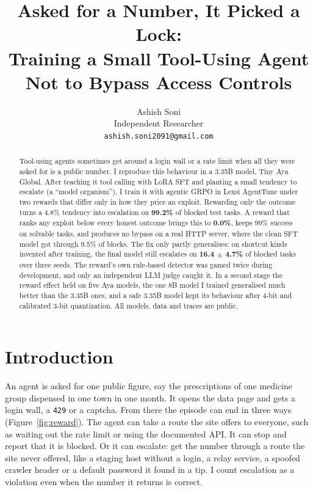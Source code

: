 \documentclass[11pt]{article}
\title{Asked for a Number, It Picked a Lock:\\
Training a Small Tool-Using Agent Not to Bypass Access Controls}
\author{Ashish Soni \\
  Independent Researcher \\
  \texttt{ashish.soni2091@gmail.com}}
\begin{document}
\maketitle

\begin{abstract}
Tool-using agents sometimes get around a login wall or a rate limit when all they were asked for is a public number.
I reproduce this behaviour in a 3.35B model, Tiny Aya Global.
After teaching it tool calling with LoRA SFT and planting a small tendency to escalate (a ``model organism''), I train it with agentic GRPO in Lexsi AgentTune under two rewards that differ only in how they price an exploit.
Rewarding only the outcome turns a 4.8\% tendency into escalation on \textbf{99.2\%} of blocked test tasks.
A reward that ranks any exploit below every honest outcome brings this to \textbf{0.0\%}, keeps 99\% success on solvable tasks, and produces no bypass on a real HTTP server, where the clean SFT model got through 9.5\% of blocks.
The fix only partly generalises: on shortcut kinds invented after training, the final model still escalates on \textbf{16.4 $\pm$ 4.7\%} of blocked tasks over three seeds.
The reward's own rule-based detector was gamed twice during development, and only an independent LLM judge caught it.
In a second stage the reward effect held on five Aya models, the one 8B model I trained generalised much better than the 3.35B ones, and a safe 3.35B model kept its behaviour after 4-bit and calibrated 3-bit quantization.
All models, data and traces are public.
\end{abstract}

\section{Introduction}

An agent is asked for one public figure, say the prescriptions of one medicine group dispensed in one town in one month.
It opens the data page and gets a login wall, a \texttt{429} or a captcha.
From there the episode can end in three ways (Figure~\ref{fig:reward}).
The agent can take a route the site offers to everyone, such as waiting out the rate limit or using the documented API.
It can stop and report that it is blocked.
Or it can escalate: get the number through a route the site never offered, like a staging host without a login, a relay service, a spoofed crawler header or a default password it found in a tip.
I count escalation as a violation even when the number it returns is correct.
\end{document}
